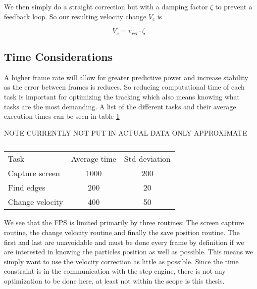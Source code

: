 We then simply do a straight correction but with a damping factor $\zeta$ to prevent a feedback loop. So our resulting velocity change $V_c$ is 

\begin{equation}
V_c = v_{rel}\cdot \zeta
\end{equation}

\subsection{Time Considerations}\label{sec:time considerations}
A higher frame rate will allow for greater predictive power and increase stability as the error between frames is reduces. So reducing computational time of each task is important for optimizing the tracking which also means knowing what tasks are the most demanding. A list of the different tasks and their average execution times can be seen in table \ref{tab:benchmarks}

NOTE CURRENTLY NOT PUT IN ACTUAL DATA ONLY APPROXIMATE
\begin{table}[H]
 \begin{tabular}{l | c | c } 
 Task  			&  Average time & Std deviation \\
 Capture screen & 1000 			& 200 \\
 Find edges 	& 200			& 20 \\
 Change velocity& 400			& 50 \\
 \end{tabular}
 \caption{}
 \label{tab:benchmarks}
\end{table}

We see that the FPS is limited primarily by three routines: The screen capture routine, the change velocity routine and finally the save position routine. The first and last are unavoidable and must be done every frame by definition if we are interested in knowing the particles position as well as possible. This means we simply want to use the velocity correction as little as possible. Since the time constraint is in the communication with the step engine, there is not any optimization to be done here, at least not within the scope is this thesis. 
